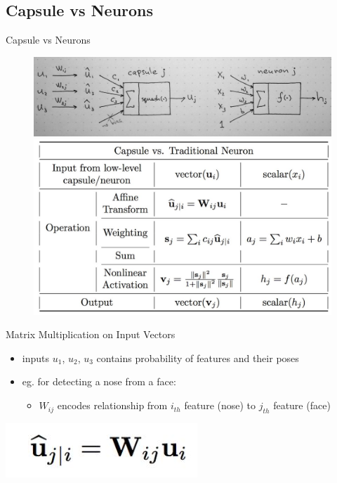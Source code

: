 \documentclass{beamer}
\begin{document}
\subsection{Capsule vs Neurons}
\begin{frame}{Capsule vs Neurons}

    \begin{figure}
        \centering
        \includegraphics[scale = 0.4]{capsules.JPG}
    
        \centering
        \includegraphics[scale = 0.5]{capsule_calculations.JPG}
    \end{figure}
\end{frame}



\begin{frame}{Matrix Multiplication on Input Vectors}
    \begin{itemize}
        \item inputs $u_1$, $u_2$, $u_3$ contains probability of features and their poses
        \item eg. for detecting a nose from a face:
            \begin{itemize}
                \item $W_{ij}$ encodes relationship from $i_{th}$ feature (nose) to $j_{th}$ feature (face)
            \end{itemize}
            
    \end{itemize}    
    
    \centering
    \includegraphics[scale=1]{capsule_1.JPG}
\end{frame}
\end{document}
